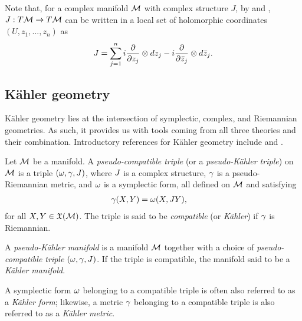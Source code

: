 \documentclass[notas.tex]{subfiles}
\begin{document}
Note that, for a complex manifold $\mathcal{M}$ with complex structure $J$, by  and , $J: T\mathcal{M} \to T\mathcal{M}$ can be written in a local set of holomorphic coordinates $(U, z_1,...,z_n)$ as
\begin{equation} \label{structure_from_coordinates}
	J = \sum_{j=1}^n i \frac{\partial}{\partial z_j} \otimes dz_j - i \frac{\partial}{\partial \bar z_j} \otimes d \bar z_j.
\end{equation}

\subsection{Kähler geometry} \label{sec_kahler}

Kähler geometry lies at the intersection of symplectic, complex, and Riemannian geometries. As such, it provides us with tools coming from all three theories and their combination. Introductory references for Kähler geometry include \cite[Part VI]{cannas_da_silva_lectures_2001} and \cite[Ch. 3]{huybrechts_complex_2005}.

\begin{defn} \label{def_compatible_triple}
	Let $\mathcal{M}$ be a manifold. A \emph{pseudo-compatible triple} (or a \emph{pseudo-Kähler triple}) on $\mathcal{M}$ is a triple $(\omega, \gamma, J)$, where $J$ is a complex structure,
	$\gamma$ is a pseudo-Riemannian metric, and
	$\omega$ is a symplectic form, all defined on $\mathcal{M}$ and satisfying
	\begin{align}
		\gamma(X,Y) &= \omega(X,JY), \nonumber
	\end{align}
	for all $X,Y \in \mathfrak{X}(\mathcal{M})$. The triple is said to be \emph{compatible} (or \emph{Kähler}) if $\gamma$ is Riemannian.	
\end{defn}

\begin{defn} \label{def_kahler}
	A \emph{pseudo-Kähler manifold} is a manifold $\mathcal{M}$ together with a choice of \emph{pseudo-compatible triple} $(\omega, \gamma, J)$. If the triple is compatible, the manifold said to be a \emph{Kähler manifold}.
\end{defn}

A symplectic form $\omega$ belonging to a compatible triple is often also referred to as a \emph{Kähler form}; likewise, a metric $\gamma$ belonging to a compatible triple is also referred to as a \emph{Kähler metric}.
\end{document}
